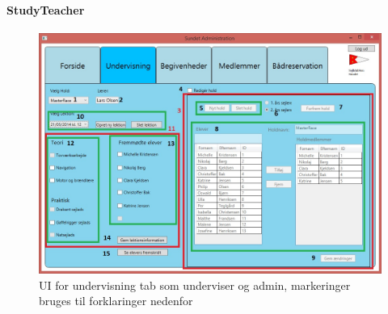 \paragraph*{StudyTeacher}
\begin{figure}[htbp]
  \centering
  \includegraphics[width=1\textwidth]{images/UI/StudyTeacherMarked.jpg}
  \caption[UIStudyTeacher]{UI for undervisning tab som underviser og admin, markeringer bruges til forklaringer nedenfor}
  \label{fig:StudyTeacher}
\end{figure}

